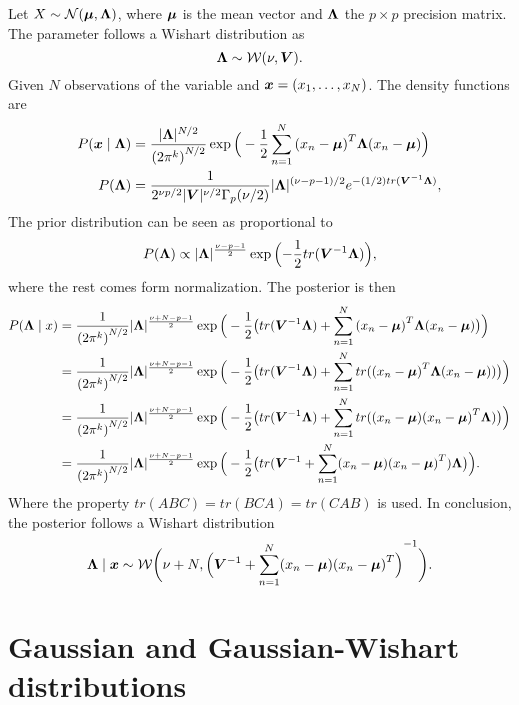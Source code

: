 Let \(X \sim \mathcal{N}(\bm{\mu}, \bm{\Lambda})\), where \(\bm{\mu}\) is the mean vector and \(\bm{\Lambda}\) the \(p \times p\)  precision matrix. The parameter follows a Wishart distribution as
\[
  \bm{\Lambda} \sim \mathcal{W}(\nu, \bm{V}).
\]
Given \(N\) observations of the variable and \(\bm{x} =(x_{1},\dots, x_{N})\). The density functions are
\[
  \begin{aligned}
    P(\bm{x} \mid \bm{\Lambda}) &= \frac{|\bm{\Lambda}|^{N/2}}{{(2\pi^{k})}^{N/2}}\exp \Big( -\frac{1}{2}\sum_{n=1}^{N}{(x_{n} - \bm{\mu})}^{T}\bm{\Lambda}(x_{n} - \bm{\mu}) \Big)\\
    P(\bm{\Lambda}) &= \frac{1}{2^{\nu p/2} |\bm{V}|^{\nu/2} \Gamma_{p}(\nu/2)}|\bm{\Lambda}|^{(\nu-p-1)/2}e^{-(1/2)tr(\bm{V}^{-1}\bm{\Lambda})},
  \end{aligned}
\]
The prior distribution can be seen as proportional to
\[
  P(\bm{\Lambda}) \propto |\bm{\Lambda}|^{\frac{\nu-p-1}{2}} \exp \Big({-\frac{1}{2}tr(\bm{V}^{-1}\bm{\Lambda})}\Big),
\]
where the rest comes form normalization.
The posterior is then
\[
  \begin{aligned}
    P(\bm{\Lambda} \mid x) &= \frac{1}{ {(2\pi^{k})}^{N/2}}|\bm{\Lambda}|^{\frac{\nu+N-p-1}{2}} \exp \Big( -\frac{1}{2} \big(tr(\bm{V}^{-1}\bm{\Lambda}) + \sum_{n=1}^{N}{(x_{n} - \bm{\mu})}^{T}\bm{\Lambda}(x_{n} - \bm{\mu})\big) \Big)\\
    &= \frac{1}{ {(2\pi^{k})}^{N/2}}|\bm{\Lambda}|^{\frac{\nu+N-p-1}{2}} \exp \Big( -\frac{1}{2} \big( tr(\bm{V}^{-1}\bm{\Lambda}) + \sum_{n=1}^{N}tr({(x_{n} - \bm{\mu})}^{T}\bm{\Lambda}(x_{n} - \bm{\mu}))\big) \Big)\\
    &= \frac{1}{ {(2\pi^{k})}^{N/2}}|\bm{\Lambda}|^{\frac{\nu+N-p-1}{2}} \exp \Big( -\frac{1}{2} \big( tr(\bm{V}^{-1}\bm{\Lambda}) + \sum_{n=1}^{N}tr ((x_{n} - \bm{\mu}){(x_{n} - \bm{\mu})}^{T}\bm{\Lambda})\big) \Big)\\
    &= \frac{1}{ {(2\pi^{k})}^{N/2}}|\bm{\Lambda}|^{\frac{\nu+N-p-1}{2}} \exp \Big( -\frac{1}{2} \big( tr ( \bm{V}^{-1} +  \sum_{n=1}^{N}(x_{n} - \bm{\mu}){(x_{n} - \bm{\mu})}^{T})\bm{\Lambda}\big) \Big).
  \end{aligned}
\]
Where the property \(tr(ABC) = tr(BCA) = tr(CAB)\) is used. In conclusion, the posterior follows a Wishart distribution
\[
  \bm{\Lambda} \mid \bm{x} \sim \mathcal{W}\bigg(\nu + N, {\Big(\bm{V}^{-1} +  \sum_{n=1}^{N}(x_{n} - \bm{\mu}){(x_{n} - \bm{\mu})}^{T}\Big)}^{-1}\bigg).
\]

\section{Gaussian and Gaussian-Wishart distributions}\label{ap:G-GW}

